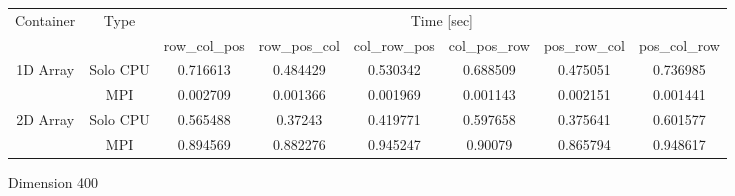 \begin{tabular}{ |c|c|c|c|c|c|c|c|  }
\hline 
\multirow{2}{*}{Container}  & \multirow{2}{*}{Type} & \multicolumn{6}{c|}{ Time [sec] } \\  \cline{3-8}

                          & & row\_col\_pos & row\_pos\_col & col\_row\_pos & col\_pos\_row  & pos\_row\_col & pos\_col\_row \\
\multirow{2}{*}{1D Array}   & Solo CPU      & 0.716613 &0.484429 &0.530342 &0.688509 &0.475051 &0.736985 \\
                            & MPI           & 0.002709 & 0.001366 & 0.001969 & 0.001143 & 0.002151 & 0.001441 \\
\hline 
 

\hline 
\multirow{2}{*}{2D Array}   & Solo CPU      & 0.565488 &0.37243 &0.419771 &0.597658 &0.375641 &0.601577 \\
                            & MPI           & 0.894569 & 0.882276 & 0.945247 & 0.90079 & 0.865794 & 0.948617 \\


\hline
\end{tabular}
\caption{ Dimension 400 }
\label{table1ntb}
